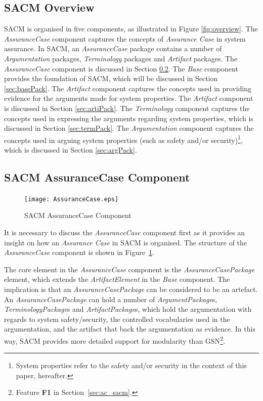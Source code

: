 \subsection{SACM Overview}
SACM is organised in five components, as illustrated in Figure \ref{fig:overview}. 
The \textit{AssuranceCase} component captures the concepts of \textit{Assurance Case} in system assurance.
In SACM, an \textit{AssuranceCase} package contains a number of \textit{Argumentation} packages, \textit{Terminology} packages and \textit{Artifact} packages.
The \textit{AssuranceCase} component is discussed in Section \ref{sec:acPack}.
The \textit{Base} component provides the foundation of SACM, which will be discussed in Section \ref{sec:basePack}.
The \textit{Artifact} component captures the concepts used in providing evidence for the arguments made for system properties. 
The \textit{Artifact} component is discussed in Section \ref{sec:artiPack}. 
The \textit{Terminology} component captures the concepts used in expressing the arguments regarding system properties, which is discussed in Section \ref{sec:termPack}. 
The \textit{Argumentation} component captures the concepts used in arguing system properties (such as safety and/or security)\footnote{System properties refer to the safety and/or security in the context of this paper, hereafter.}, which is discussed in Section \ref{sec:argPack}.
 
\subsection{SACM AssuranceCase Component}
\label{sec:acPack}
\begin{figure}
	\centering
	\texttt{[image: AssuranceCase.eps]}
	\caption{SACM AssuranceCase Component}
	\label{fig:ac}
\end{figure}
It is necessary to discuss the \textit{AssuranceCase} component first as it provides an insight on how an \textit{Assurance Case} in SACM is organised. 
The structure of the \textit{AssuranceCase} component is shown in Figure~\ref{fig:ac}.

The core element in the \textit{AssuranceCase} component is the \textit{AssuranceCasePackage} element, which extends the \textit{ArtifactElement} in the \textit{Base} component. 
The implication is that an \textit{AssuranceCasePackage} can be considered to be an artefact. 
An \textit{AssuranceCasePackage} can hold a number of \textit{ArgumentPackage}s, \textit{TerminologyPackage}s and \textit{ArtifactPackage}s, which hold the argumentation with regards to system safety/security, the controlled vocabularies used in the argumentation, and the artifact that back the argumentation as evidence.
In this way, SACM provides more detailed support for modularity than GSN\footnote{Feature \textbf{F1} in Section~\ref{sec:ac_sacm}.}. 

